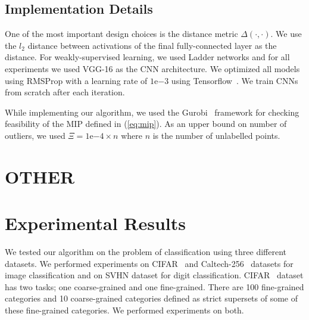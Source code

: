 \documentclass{article} %
\begin{document}
\subsection{Implementation Details} \label{sec:imp} One of the most important design choices is the distance metric
$\Delta(\cdot,\cdot)$. We use the $l_2$ distance between activations of the final fully-connected layer as the distance.
For weakly-supervised learning, we used Ladder networks \citep{ladder} and for all experiments we used VGG-16 \citep{vgg}
as the CNN architecture. We optimized all models using RMSProp with a learning rate of $1\mathrm{e}{-3}$ using
Tensorflow~\citep{tensorflow}. We train CNNs from scratch after each iteration. %

While implementing our algorithm, we used the Gurobi~\citep{gurobi} framework for checking feasibility of the MIP defined
in (\eqref{eq:mip}). As an upper bound on number of outliers, we used $\Xi=1\mathrm{e}{-4} \times n$ where $n$ is the
number of unlabelled points.


\section{OTHER}

\section{Experimental Results}
\label{sec:exp}
We tested our algorithm on the problem of classification using three different datasets. We performed experiments on CIFAR~\citep{cifar} and Caltech-256~\citep{caltech256} datasets for image classification and on SVHN\citep{svhn} dataset for digit classification. CIFAR~\citep{cifar} dataset has two tasks; one coarse-grained and one fine-grained. There are 100 fine-grained categories and 10 coarse-grained categories defined as strict supersets of some of these fine-grained categories. We performed experiments on both.
\end{document}
